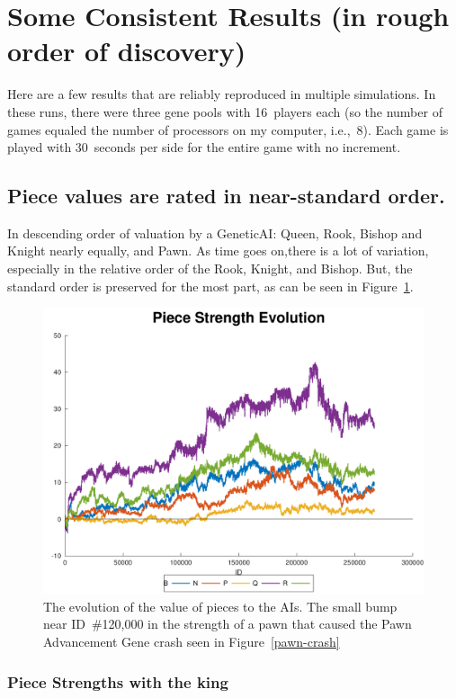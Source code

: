\documentclass[letterpaper]{article}
\renewcommand{\_}{\allowbreak\textunderscore\allowbreak}
\begin{document}
\section{Some Consistent Results (in rough order of discovery)}

Here are a few results that are reliably reproduced in multiple simulations. In these runs, there were three gene pools with 16~players each (so the number of games equaled the number of processors on my computer, i.e.,~8). Each game is played with 30~seconds per side for the entire game with no increment.

\subsection{Piece values are rated in near-standard order.}
In descending order of valuation by a Genetic\_AI: Queen, Rook, Bishop and Knight nearly equally, and Pawn. As time goes on,there is a lot of variation, especially in the relative order of the Rook, Knight, and Bishop. But, the standard order is preserved for the most part, as can be seen in Figure~\ref{piece-value-plot}.
\begin{figure}[htb]
	\centering
	\includegraphics[width=\textwidth]{pawn-crash-strength-plot}
	\caption{The evolution of the value of pieces to the AIs. The small bump near ID~\#120,000 in the strength of a pawn that caused the Pawn Advancement Gene crash seen in Figure~\ref{pawn-crash}}
	\label{piece-value-plot}
\end{figure}

\subsubsection{Piece Strengths with the king}
\label{piece-strength-with-king}
\end{document}
